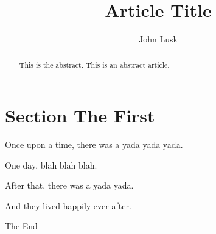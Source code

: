 \documentclass[11pt,letterpaper]{article}
\title{Article Title}
\author{John Lusk}
\begin{document}
\maketitle

\begin{abstract}
This is the abstract.  This is an abstract article.
\end{abstract}

\section{Section The First}

Once upon a time, there was a yada yada yada.

One day, blah blah blah.

After that, there was a yada yada.

And they lived happily ever after.

\begin{center}
	The End
\end{center}
\end{document}
